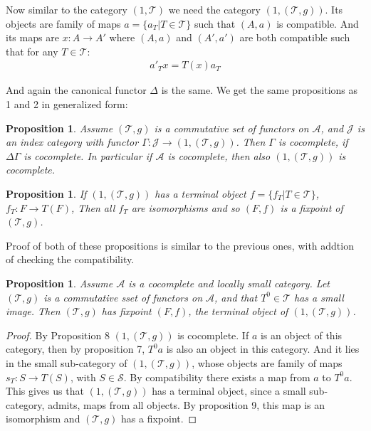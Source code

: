 \documentclass[12pt]{article}
\newcounter{the}
\newtheorem{proposition}[the]{Proposition}
\begin{document}
Now similar to the category $(1, \mathscr T)$ we need the category $(1, (\mathscr T, g))$. Its objects are family of maps $a = \{a_T | T \in \mathscr T\}$ such that $(A, a)$ is compatible. And its maps are $x: A \to A'$ where $(A, a)$ and $(A', a')$ are both compatible such that for any $T \in \mathscr T$:
\begin{gather*}
    a'_T x = T(x) a_T
\end{gather*}

And again the canonical functor $\Delta$ is the same. We get the same propositions as 1 and 2 in generalized form:

\begin{proposition}
    Assume $(\mathscr T, g)$ is a commutative set of functors on $\mathscr A$, and $\mathscr J$ is an index category with functor $\Gamma: \mathscr J \to (1, (\mathscr T, g))$. Then $\Gamma$ is cocomplete, if $\Delta \Gamma$ is cocomplete. In particular if $\mathscr A$ is cocomplete, then also $(1, (\mathscr T, g))$ is cocomplete.
\end{proposition}

\begin{proposition}
    If $(1, (\mathscr T, g))$ has a terminal object $f = \{f_T | T \in \mathscr T\}$, $f_T: F \to T(F)$, Then all $f_T$ are isomorphisms and so $(F, f)$ is a fixpoint of $(\mathscr T, g)$.
\end{proposition}

Proof of both of these propositions is similar to the previous ones, with addtion of checking the compatibility.


\begin{proposition}
    Assume $\mathscr A$ is a cocomplete and locally small category. Let $(\mathscr T, g)$ is a commutative sset of functors on $\mathscr A$, and that $T^0 \in \mathscr T$ has a small image. Then $(\mathscr T, g)$ has fixpoint $(F, f)$, the terminal object of $(1, (\mathscr T, g))$.
\end{proposition}

\begin{proof}
    By Proposition 8 $(1, (\mathscr T, g))$ is cocomplete. If $a$ is an object of this category, then by proposition 7, $T^0 a$ is also an object in this category. And it lies in the small sub-category of $(1, (\mathscr T, g))$, whose objects are family of maps $s_T: S \to T(S)$, with $S \in \mathscr S$.
    By compatibility there exists a map from $a$ to $T^0 a$. This gives us that $(1, (\mathscr T, g))$ has a terminal object, since a small sub-category, admits, maps from all objects. By proposition 9, this map is an isomorphism and $(\mathscr T, g)$ has a fixpoint.
\end{proof}
\end{document}
